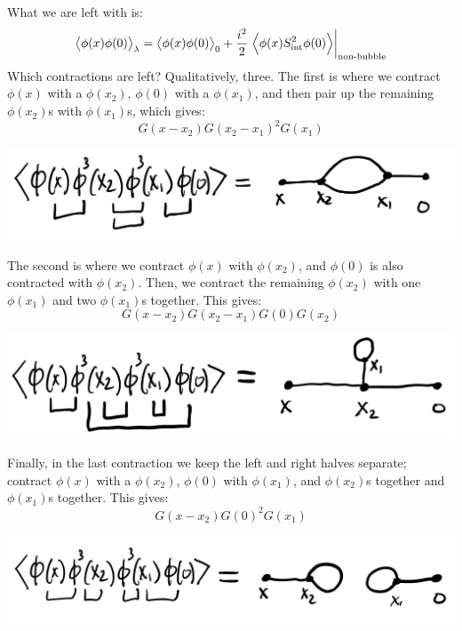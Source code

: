What we are left with is:
\begin{equation}
    \left< \phi(x)\phi(0) \right>_\lambda = \left< \phi(x)\phi(0) \right>_0 + \frac{i^2}{2}\left.\left< \phi(x)S^2_{\text{int}}\phi(0) \right>\right|_{\text{non-bubble}}
\end{equation}
Which contractions are left? Qualitatively, three. The first is where we contract $\phi(x)$ with a $\phi(x_2)$, $\phi(0)$ with a $\phi(x_1)$, and then pair up the remaining $\phi(x_2)$s with $\phi(x_1)$s, which gives:
\begin{equation}
    G(x - x_2)G(x_2 - x_1)^2 G(x_1)
\end{equation}
\begin{center}
    \includegraphics[scale=0.4]{Lectures/Figures/lec11-diag3.png}
\end{center}
The second is where we contract $\phi(x)$ with $\phi(x_2)$, and $\phi(0)$ is also contracted with $\phi(x_2)$. Then, we contract the remaining $\phi(x_2)$ with one $\phi(x_1)$ and two $\phi(x_1)$s together. This gives:
\begin{equation}
    G(x - x_2)G(x_2 - x_1)G(0)G(x_2)
\end{equation}
\begin{center}
    \includegraphics[scale=0.4]{Lectures/Figures/lec11-diag4.png}
\end{center}
Finally, in the last contraction we keep the left and right halves separate; contract $\phi(x)$ with a $\phi(x_2)$, $\phi(0)$ with $\phi(x_1)$, and $\phi(x_2)$s together and $\phi(x_1)$s together. This gives:
\begin{equation}
    G(x - x_2)G(0)^2 G(x_1)
\end{equation}
\begin{center}
    \includegraphics[scale=0.4]{Lectures/Figures/lec11-diag5.png}
\end{center}

